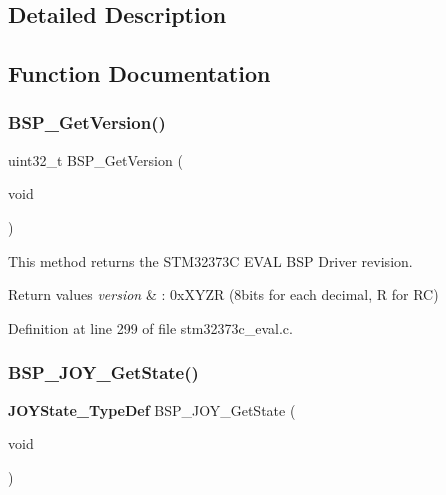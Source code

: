 \subsection{Detailed Description}


\subsection{Function Documentation}
\mbox{\label{group___private___functions_ga65d13608f7010a8068614154cb142cd6}} 
\subsubsection{B\+S\+P\+\_\+\+Get\+Version()}
{\footnotesize\ttfamily uint32\+\_\+t B\+S\+P\+\_\+\+Get\+Version (\begin{DoxyParamCaption}\item[{void}]{ }\end{DoxyParamCaption})}



This method returns the S\+T\+M32373C E\+V\+AL B\+SP Driver revision. 


\begin{DoxyRetVals}{Return values}
{\em version} & \+: 0x\+X\+Y\+ZR (8bits for each decimal, R for RC) \\
\hline
\end{DoxyRetVals}


Definition at line 299 of file stm32373c\+\_\+eval.\+c.

\mbox{\label{group___private___functions_gac978098a78085c416a176458d850c807}} 
\subsubsection{B\+S\+P\+\_\+\+J\+O\+Y\+\_\+\+Get\+State()}
{\footnotesize\ttfamily \textbf{ J\+O\+Y\+State\+\_\+\+Type\+Def} B\+S\+P\+\_\+\+J\+O\+Y\+\_\+\+Get\+State (\begin{DoxyParamCaption}\item[{void}]{ }\end{DoxyParamCaption})}



